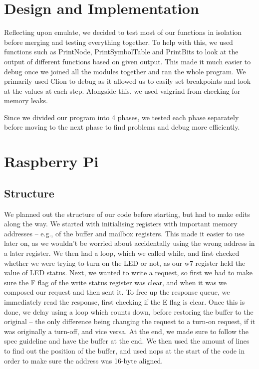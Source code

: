 \documentclass[12pt]{article}
\begin{document}
\section{Design and Implementation}

Reflecting upon emulate, we decided to test most of our functions in isolation before merging and testing everything together. To help with this, we used functions such as PrintNode, PrintSymbolTable and PrintBits to look at the output of different functions based on given output. This made it much easier to debug once we joined all the modules together and ran the whole program. We primarily used Clion to debug as it allowed us to easily set breakpoints and look at the values at each step. Alongside this, we used valgrind from checking for memory leaks.

Since we divided our program into 4 phases, we tested each phase separately before moving to the next phase to find problems and debug more efficiently.

\section{Raspberry Pi}

\subsection{Structure}

We planned out the structure of our code before starting, but had to make edits along the way. We started with initialising registers with important memory addresses – e.g., of the buffer and mailbox registers. This made it easier to use later on, as we wouldn’t be worried about accidentally using the wrong address in a later register. We then had a loop, which we called while, and first checked whether we were trying to turn on the LED or not, as our w7 register held the value of LED status. Next, we wanted to write a request, so first we had to make sure the F flag of the write status register was clear, and when it was we composed our request and then sent it. To free up the response queue, we immediately read the response, first checking if the E flag is clear. Once this is done, we delay using a loop which counts down, before restoring the buffer to the original – the only difference being changing the request to a turn-on request, if it was originally a turn-off, and vice versa. At the end, we made sure to follow the spec guideline and have the buffer at the end. We then used the amount of lines to find out the position of the buffer, and used nops at the start of the code in order to make sure the address was 16-byte aligned.
\end{document}
